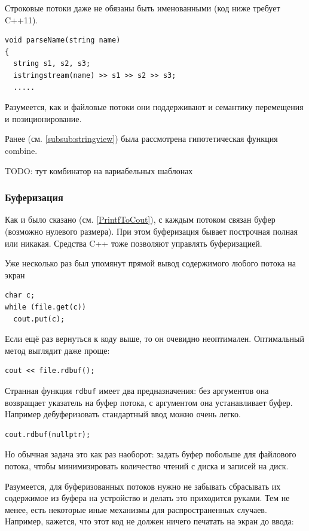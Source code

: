 \documentclass[a4paper,12pt,oneside]{article}
\newif\ifanswers
\begin{document}
\ifanswers
Правильный ответ: value: 2a 0.2442
\fi

Строковые потоки даже не обязаны быть именованными (код ниже требует C++11).

\begin{lstlisting}
void parseName(string name)
{
  string s1, s2, s3;
  istringstream(name) >> s1 >> s2 >> s3;
  .....
\end{lstlisting}

Разумеется, как и файловые потоки они поддерживают и семантику перемещения и позиционирование.

Ранее (см. \ref{subsub:stringview}) была рассмотрена гипотетическая функция combine.

TODO: тут комбинатор на вариабельных шаблонах

\subsubsection{Буферизация}

Как и было сказано (см. \ref{PrintfToCout}), с каждым потоком связан буфер (возможно нулевого размера). При этом буферизация бывает построчная полная или никакая. Средства C++ тоже позволяют управлять буферизацией.

Уже несколько раз был упомянут прямой вывод содержимого любого потока на экран

\begin{lstlisting}
char c;
while (file.get(c)) 
  cout.put(c);
\end{lstlisting}

Если ещё раз вернуться к коду выше, то он очевидно неоптимален. Оптимальный метод выглядит даже проще:

\begin{lstlisting}
cout << file.rdbuf();
\end{lstlisting}

Странная функция \lstinline!rdbuf! имеет два предназначения: без аргументов она возвращает указатель на буфер потока, с аргументом она устанавливает буфер. Например дебуферизовать стандартный ввод можно очень легко.

\begin{lstlisting}
cout.rdbuf(nullptr);
\end{lstlisting}

Но обычная задача это как раз наоборот: задать буфер побольше для файлового потока, чтобы минимизировать количество чтений с диска и записей на диск.

Разумеется, для буферизованных потоков нужно не забывать сбрасывать их содержимое из буфера на устройство и делать это приходится руками. Тем не менее, есть некоторые иные механизмы для распространенных случаев. Например, кажется, что этот код не должен ничего печатать на экран до ввода:
\end{document}
